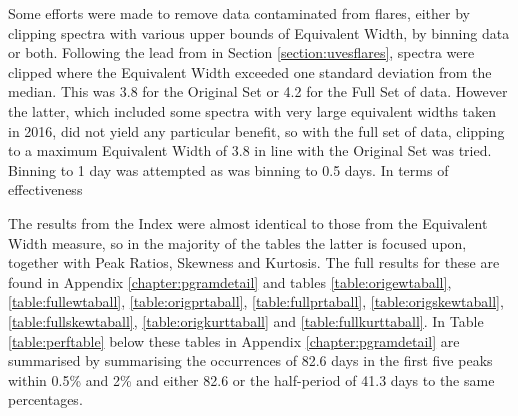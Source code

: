 Some efforts were made to remove data contaminated from flares, either by clipping spectra with various upper bounds of
Equivalent Width, by binning data or both. Following the lead from {\uves} in Section \ref{section:uvesflares}, spectra
were clipped where the Equivalent Width exceeded one standard deviation from the median. This was 3.8 for the Original
Set or 4.2 for the Full Set of data. However the latter, which included some spectra with very large equivalent widths
taken in 2016, did not yield any particular benefit, so with the full set of data, clipping to a maximum Equivalent
Width of 3.8 in line with the Original Set was tried. Binning to 1 day was attempted as was binning to 0.5 days. In
terms of effectiveness 

The results from the {\ha} Index were almost identical to those from the Equivalent Width measure, so in the majority of
the tables the latter is focused upon, together with Peak Ratios, Skewness and Kurtosis. The full results for these are
found in Appendix \ref{chapter:pgramdetail} and tables \ref{table:origewtaball}, \ref{table:fullewtaball},
\ref{table:origprtaball}, \ref{table:fullprtaball}, \ref{table:origskewtaball}, \ref{table:fullskewtaball},
\ref{table:origkurttaball} and \ref{table:fullkurttaball}. In Table \ref{table:perftable} below these tables in Appendix
\ref{chapter:pgramdetail} are summarised by summarising the occurrences of 82.6 days in the first five peaks within 0.5\%
and 2\% and either 82.6 or the half-period of 41.3 days to the same percentages.

\begin{table}[!htbp]
\centering
{}
\caption{This table summarises the approximate recovery performance in terms of finding the expected period of 82.6 and
  this or the half-period of 41.3 within the first five peaks and within a given percentage considering all line measurement methods employed with the
  original and full data. All clipping and binning of the data is included in the summary for each method. The full data
  is listed in Appendix \ref{chapter:pgramdetail}.}
\protect\label{table:perftable}
\end{table}

